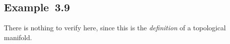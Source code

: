 \subsection{Example~3.9}

There is nothing to verify here, since this is the \emph{definition} of a topological manifold.
